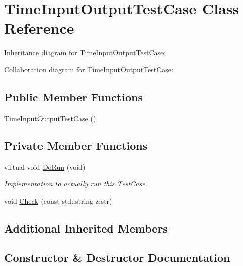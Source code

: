 \hypertarget{classTimeInputOutputTestCase}{}\section{Time\+Input\+Output\+Test\+Case Class Reference}
\label{classTimeInputOutputTestCase}


Inheritance diagram for Time\+Input\+Output\+Test\+Case\+:


Collaboration diagram for Time\+Input\+Output\+Test\+Case\+:
\subsection*{Public Member Functions}
\begin{DoxyCompactItemize}
\item 
\hyperlink{classTimeInputOutputTestCase_a051e98954032ab6b537c0589d7121aa3}{Time\+Input\+Output\+Test\+Case} ()
\end{DoxyCompactItemize}
\subsection*{Private Member Functions}
\begin{DoxyCompactItemize}
\item 
virtual void \hyperlink{classTimeInputOutputTestCase_aed755cb09172197ef1a3ebe096c864db}{Do\+Run} (void)
\begin{DoxyCompactList}\small\item\em Implementation to actually run this Test\+Case. \end{DoxyCompactList}\item 
void \hyperlink{classTimeInputOutputTestCase_aff6cea5470a7596d9a7db0eef03592f3}{Check} (const std\+::string \&str)
\end{DoxyCompactItemize}
\subsection*{Additional Inherited Members}


\subsection{Constructor \& Destructor Documentation}
